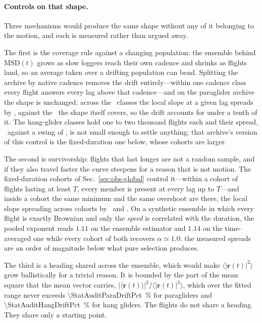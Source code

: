 \begin{revblock}
\paragraph{Controls on that shape.}
Three mechanisms would produce the same shape without any of it belonging to the motion,
and each is measured rather than argued away.

The first is the coverage rule against a changing population: the ensemble behind
$\mathrm{MSD}(t)$ grows as slow loggers reach their own cadence and shrinks as flights
land, so an average taken over a drifting population can bend. Splitting the archive by
native cadence removes the drift entirely---within one cadence class every flight answers
every lag above that cadence---and on the paraglider archive the shape is unchanged:
across the \StatAuditParaCadenceCohorts\ classes the local slope at a given lag spreads by
\StatAuditParaCadenceSpread, against the \StatAuditParaEaSlopeSwing\ the shape itself
covers, so the drift accounts for under a tenth of it. The hang-glider classes hold
one to two thousand flights each and their spread, \StatAuditHangCadenceSpread\ against a
swing of \StatAuditHangEaSlopeSwing, is not small enough to settle anything; that
archive's version of this control is the fixed-duration one below, whose cohorts are
larger.

The second is survivorship: flights that last longer are not a random sample, and if they
also travel faster the curve steepens for a reason that is not motion. The fixed-duration
cohorts of Sec.~\ref{sec:obs-global} control it---within a cohort of flights lasting at
least $T$, every member is present at every lag up to $T$---and inside a cohort the same
minimum and the same overshoot are there, the local slope spreading across cohorts by
\StatAuditParaDurationSpread\ and \StatAuditHangDurationSpread. On a synthetic ensemble in
which every flight is exactly Brownian and only the \emph{speed} is correlated with the
duration, the pooled exponent reads $1.11$ on the ensemble estimator and $1.14$ on the
time-averaged one while every cohort of both recovers $\alpha\simeq1.0$: the measured
spreads are an order of magnitude below what pure selection produces.

The third is a heading shared across the ensemble, which would make
$\langle|\mathbf{r}(t)|^2\rangle$ grow ballistically for a trivial reason. It is bounded
by the part of the mean square that the mean vector carries,
$|\langle\mathbf{r}(t)\rangle|^2/\langle|\mathbf{r}(t)|^2\rangle$, which over the fitted
range never exceeds \SI{\StatAuditParaDriftPct}{\percent} for paragliders and
\SI{\StatAuditHangDriftPct}{\percent} for hang gliders. The flights do not share a
heading. They share only a starting point.


\end{revblock}
